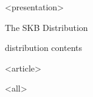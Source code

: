 \mode
<presentation>

\begin{frame}{The SKB Distribution}
  \label{start:distribution}

  \begin{block}{distribution contents}
  \end{block}
\end{frame}




\mode
<article>

\bigskip


\clearpage

\mode
<all>
